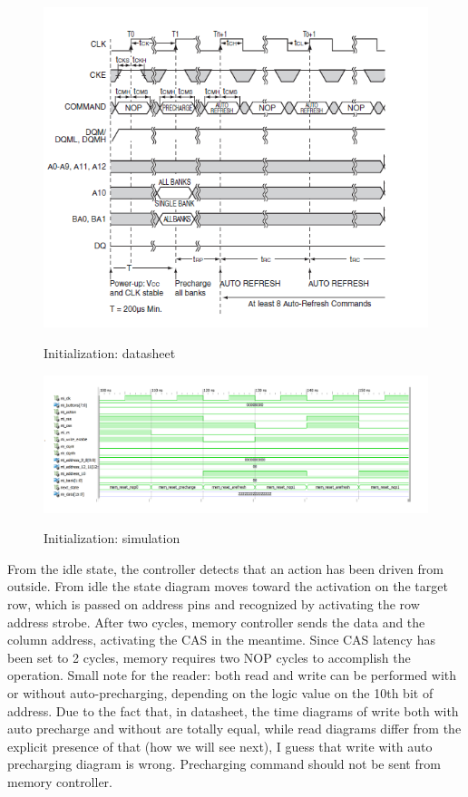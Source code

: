 \begin{figure}[H]
\centering
\includegraphics{Immagini/29}
\label{29}
\caption{Initialization: datasheet}
\end{figure}

\begin{figure}[H]
\centering
\includegraphics[scale=.5]{Immagini/28}
\label{28}
\caption{Initialization: simulation}
\end{figure}
\newpage
From the idle state, the controller detects that an action has been driven from outside. From idle the state diagram moves toward the activation on the target row, which is passed on address pins and recognized by activating the row address strobe. After two cycles, memory controller sends the data and the column address, activating the CAS in the meantime. Since CAS latency has been set to 2 cycles, memory requires two NOP cycles to accomplish the operation. Small note for the reader: both read and write can be performed with or without auto-precharging, depending on the logic value on the 10th bit of address. Due to the fact that, in datasheet, the time diagrams of write both with auto precharge and without are totally equal, while read diagrams differ from the explicit presence of that (how we will see next), I guess that write with auto precharging diagram is wrong. Precharging command should not be sent from memory controller.

